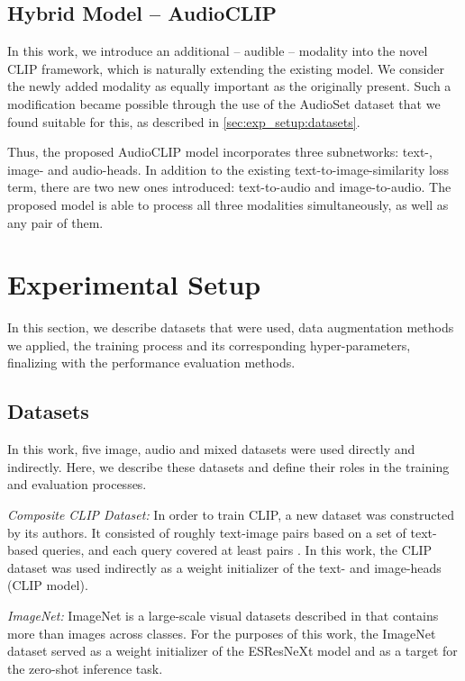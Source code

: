 \documentclass[runningheads]{llncs}
\begin{document}
\subsection{Hybrid Model -- AudioCLIP} \label{sec:model:audioclip}

In this work, we introduce an additional -- audible -- modality into the novel \mbox{CLIP} framework, which is naturally extending the existing model.
We consider the newly added modality as equally important as the originally present.
Such a modification became possible through the use of the \mbox{AudioSet} \cite{gemmeke2017audioset} dataset that we found suitable for this, as described in \autoref{sec:exp_setup:datasets}.

Thus, the proposed \mbox{AudioCLIP} model incorporates three subnetworks: text-, image- and audio-heads.
In addition to the existing text-to-image-similarity loss term, there are two new ones introduced: text-to-audio and image-to-audio.
The proposed model is able to process all three modalities simultaneously, as well as any pair of them.

\section{Experimental Setup} \label{sec:exp_setup}
In this section, we describe datasets that were used, data augmentation methods we applied, the training process and its corresponding hyper-parameters, finalizing with the performance evaluation methods.

\subsection{Datasets} \label{sec:exp_setup:datasets}
In this work, five image, audio and mixed datasets were used directly and indirectly.
Here, we describe these datasets and define their roles in the training and evaluation processes.

\emph{Composite CLIP Dataset:} In order to train \mbox{CLIP}, a new dataset was constructed by its authors.
It consisted of roughly  text-image pairs based on a set of  text-based queries, and each query covered at least  pairs \cite{radford2021clip}.
In this work, the \mbox{CLIP} dataset was used indirectly as a weight initializer of the text- and image-heads (\mbox{CLIP} model).

\emph{ImageNet:} \mbox{ImageNet} is a large-scale visual datasets described in \cite{deng2009imagenet} that contains more than \mbox{\:\si{\mega}} images across  classes.
For the purposes of this work, the \mbox{ImageNet} dataset served as a weight initializer of the \mbox{ESResNeXt} model and as a target for the zero-shot inference task.
\end{document}
